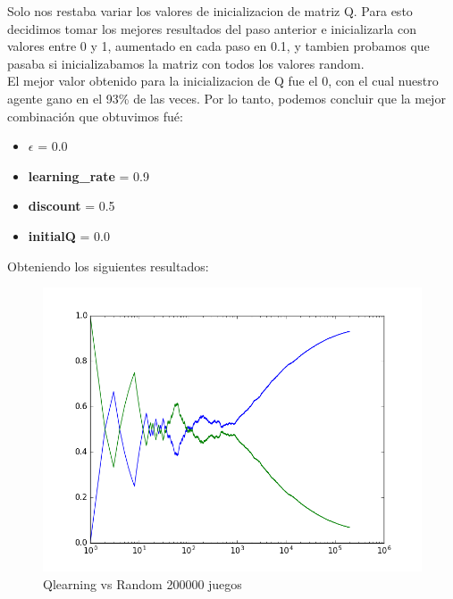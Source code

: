 Solo nos restaba variar los valores de inicializacion de matriz Q. Para esto decidimos tomar los mejores resultados del paso
 anterior e inicializarla con valores entre 0 y 1, aumentado en cada paso en 0.1, y tambien probamos que pasaba si
 inicializabamos la matriz con todos los valores random. \\

El mejor valor obtenido para la inicializacion de Q fue el 0, con el cual nuestro agente gano en el 93\% de las veces.
Por lo tanto, podemos concluir que la mejor combinación que obtuvimos fué:

\begin{itemize}
  \item  \textbf{$\epsilon$} = 0.0
  \item \textbf{learning\_rate} = 0.9
  \item \textbf{discount} = 0.5
  \item \textbf{initialQ} = 0.0
\end{itemize}

Obteniendo los siguientes resultados:

\begin{figure}[h]
 \centering
  \begin{minipage}[c]{1\textwidth}
	\centering
	\includegraphics[scale=0.5]{img/QlearningRandomEgreedy200000.png}
        \caption{Qlearning vs Random 200000 juegos}
  \end{minipage}
\end{figure}

